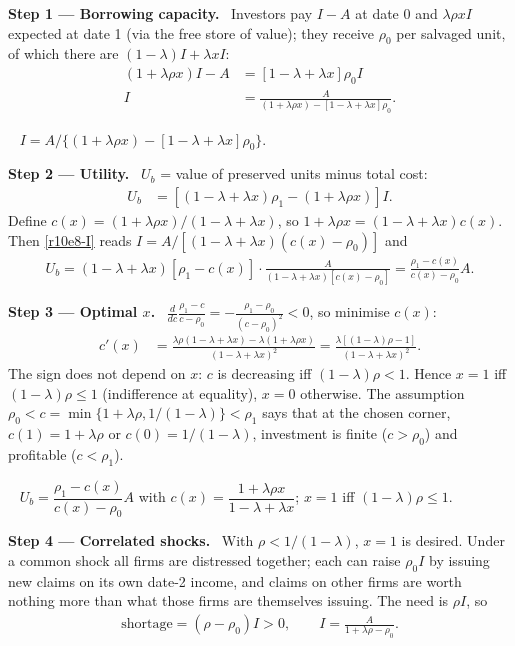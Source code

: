 \documentclass[11pt,a4paper]{article}
\newcommand{\step}[2]{\par\medskip\noindent\textbf{Step #1 --- #2.}~}
\newcommand{\answer}[1]{\par\smallskip\noindent\fbox{\textbf{Answer\if\relax\detokenize{#1}\relax\else\ #1\fi.}}~}
\begin{document}
\step{1}{Borrowing capacity} Investors pay $I-A$ at date 0 and $\lambda\rho xI$ expected at date 1 (via the free store of value); they receive $\rho_0$ per salvaged unit, of which there are $(1-\lambda)I+\lambda xI$:
\begin{align}
  (1+\lambda\rho x)I-A &= [1-\lambda+\lambda x]\rho_0I \nonumber\\
  I &= \frac{A}{(1+\lambda\rho x)-[1-\lambda+\lambda x]\rho_0}. \label{r10e8-I}
\end{align}

\answer{(i)} $I=A/\{(1+\lambda\rho x)-[1-\lambda+\lambda x]\rho_0\}$.

\step{2}{Utility} $U_b$ = value of preserved units minus total cost:
\begin{align}
  U_b &= [(1-\lambda+\lambda x)\rho_1-(1+\lambda\rho x)]I. \label{r10e8-Ub0}
\end{align}
Define $c(x)=(1+\lambda\rho x)/(1-\lambda+\lambda x)$, so $1+\lambda\rho x=(1-\lambda+\lambda x)c(x)$. Then \eqref{r10e8-I} reads $I=A/[(1-\lambda+\lambda x)(c(x)-\rho_0)]$ and
\begin{align}
  U_b = (1-\lambda+\lambda x)[\rho_1-c(x)]\cdot\frac{A}{(1-\lambda+\lambda x)[c(x)-\rho_0]} = \frac{\rho_1-c(x)}{c(x)-\rho_0}A. \label{r10e8-Ub}
\end{align}

\step{3}{Optimal $x$} $\frac{d}{dc}\frac{\rho_1-c}{c-\rho_0}=-\frac{\rho_1-\rho_0}{(c-\rho_0)^2}<0$, so minimise $c(x)$:
\begin{align}
  c'(x) &= \frac{\lambda\rho(1-\lambda+\lambda x)-\lambda(1+\lambda\rho x)}{(1-\lambda+\lambda x)^2} = \frac{\lambda[(1-\lambda)\rho-1]}{(1-\lambda+\lambda x)^2}. \label{r10e8-cprime}
\end{align}
The sign does not depend on $x$: $c$ is decreasing iff $(1-\lambda)\rho<1$. Hence $x=1$ iff $(1-\lambda)\rho\leq1$ (indifference at equality), $x=0$ otherwise. The assumption $\rho_0<c=\min\{1+\lambda\rho,1/(1-\lambda)\}<\rho_1$ says that at the chosen corner, $c(1)=1+\lambda\rho$ or $c(0)=1/(1-\lambda)$, investment is finite ($c>\rho_0$) and profitable ($c<\rho_1$).

\answer{(ii)} $U_b=\dfrac{\rho_1-c(x)}{c(x)-\rho_0}A$ with $c(x)=\dfrac{1+\lambda\rho x}{1-\lambda+\lambda x}$; $x=1$ iff $(1-\lambda)\rho\leq1$.

\step{4}{Correlated shocks} With $\rho<1/(1-\lambda)$, $x=1$ is desired. Under a common shock all firms are distressed together; each can raise $\rho_0I$ by issuing new claims on its own date-2 income, and claims on other firms are worth nothing more than what those firms are themselves issuing. The need is $\rho I$, so
\begin{align}
  \text{shortage} = (\rho-\rho_0)I > 0, \qquad I=\frac{A}{1+\lambda\rho-\rho_0}. \label{r10e8-short}
\end{align}
\end{document}
